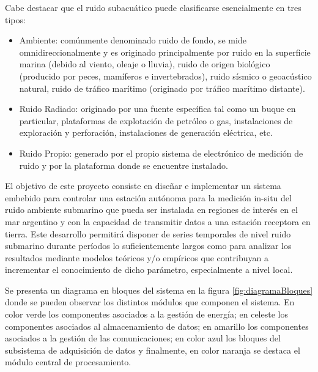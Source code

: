 Cabe destacar que el ruido subacuático puede clasificarse esencialmente en tres tipos:

\begin{itemize}
	\item Ambiente: comúnmente denominado ruido de fondo, se mide omnidireccionalmente y es originado principalmente por ruido en la superficie marina (debido al viento, oleaje o lluvia), ruido de origen biológico (producido por peces, mamíferos e invertebrados), ruido sísmico o geoacústico natural, ruido de tráfico marítimo (originado por tráfico marítimo distante).
	\item Ruido Radiado: originado por una fuente específica tal como un buque en particular, plataformas de explotación de petróleo o gas, instalaciones de exploración y perforación, instalaciones de generación eléctrica, etc.
	\item Ruido Propio: generado por el propio sistema de electrónico de medición de ruido y por la plataforma donde se encuentre instalado.
\end{itemize} 

El objetivo de este proyecto consiste en diseñar e implementar un sistema embebido para controlar una estación autónoma para la medición in-situ del ruido ambiente submarino que pueda ser instalada en regiones de interés en el mar argentino y con la capacidad de transmitir datos a una estación receptora en tierra. Este desarrollo permitirá disponer de series temporales de nivel ruido submarino durante períodos lo suficientemente largos como para analizar los resultados mediante modelos teóricos y/o empíricos que contribuyan a incrementar el conocimiento de dicho parámetro, especialmente a nivel local.

Se presenta un diagrama en bloques del sistema en la figura \ref{fig:diagramaBloques} donde se pueden observar los distintos módulos que componen el sistema.  En color verde los componentes asociados a la gestión de energía; en celeste los componentes asociados al almacenamiento de datos; en amarillo los componentes asociados a la gestión de las comunicaciones; en color azul los bloques del subsistema de adquisición de datos y finalmente, en color naranja se destaca el módulo central de procesamiento.

